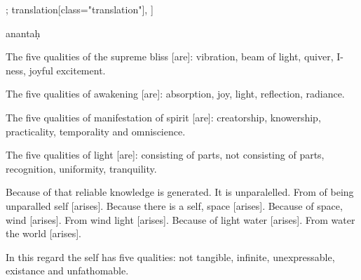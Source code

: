\begin{alignment}[
  texts=edition[class="edition"];
  translation[class="translation"],
  ]
\begin{edition}
\begin{prose}
{  
  \rdg[wit={B}]{\om}}\dd{} 
anantaḥ\dd{}
      \dd{}
      \dd{}
      \dd{}
    \end{prose}
  \end{edition}
  \begin{translation}
    \begin{tlate}
The five qualities of the supreme bliss [are]: vibration, beam of light, quiver, I-ness, joyful excitement.

The five qualities of awakening [are]: absorption, joy, light, reflection, radiance.

The five qualities of manifestation of spirit [are]: creatorship, knowership, practicality, temporality and omniscience.

The five qualities of light [are]: consisting of parts, not consisting of parts, recognition, uniformity, tranquility.

Because of that reliable knowledge is generated. It is unparalelled. From of being unparalled self [arises]. Because there is a self, space [arises]. Because of space, wind [arises]. From wind light [arises]. Because of light water [arises]. From water the world [arises].

In this regard the self has five qualities: not tangible, infinite, unexpressable, existance and unfathomable.
    \end{tlate}
  \end{translation}
\end{alignment}
\pagebreak %
